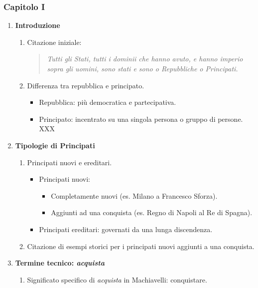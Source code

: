 \documentclass{article}
\begin{document}
\newpage
\subsubsection{Capitolo I}

\begin{enumerate}
    \item \textbf{Introduzione}
    \begin{enumerate}[label*=\arabic*.]
        \item Citazione iniziale:
        \begin{quote}
            \itshape
            Tutti gli Stati, tutti i dominii che hanno avuto, e hanno imperio sopra gli uomini, sono stati e sono o Repubbliche o Principati.
        \end{quote}
        \item Differenza tra repubblica e principato.
        \begin{itemize}
            \item Repubblica: più democratica e partecipativa.
            \item Principato: incentrato su una singola persona o gruppo di persone. XXX
        \end{itemize}
    \end{enumerate}

    \item \textbf{Tipologie di Principati}
    \begin{enumerate}[label*=\arabic*.]
        \item Principati nuovi e ereditari.
        \begin{itemize}
            \item Principati nuovi:
            \begin{itemize}
                \item Completamente nuovi (es. Milano a Francesco Sforza).
                \item Aggiunti ad una conquista (es. Regno di Napoli al Re di Spagna).
            \end{itemize}
            \item Principati ereditari: governati da una lunga discendenza.
        \end{itemize}
        \item Citazione di esempi storici per i principati nuovi aggiunti a una conquista.
    \end{enumerate}

    \item \textbf{Termine tecnico: \textit{acquista}}
    \begin{enumerate}[label*=\arabic*.]
        \item Significato specifico di \textit{acquista} in Machiavelli: conquistare.
    \end{enumerate}


\end{enumerate}
\end{document}

